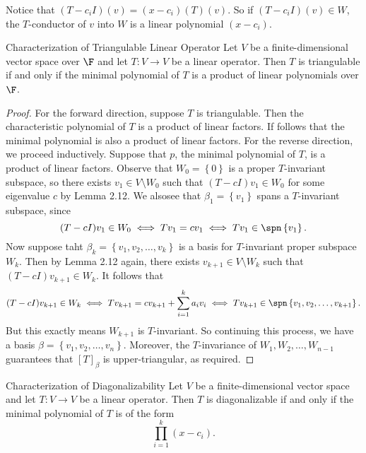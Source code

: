 \documentclass[linearalgebraII]{subfiles}
\begin{document}
    \begin{remark}
        Notice that $(T-c_iI)(v) = (x-c_i)(T)(v)$. So if $(T-c_iI)(v)\in W$, the $T$-conductor of $v$ into $W$ is a linear polynomial $(x-c_i)$.
    \end{remark}

    \begin{theorem}{Characterization of Triangulable Linear Operator}
        Let $V$ be a finite-dimensional vector space over $\F$ and let $T:V\to V$ be a linear operator. Then $T$ is triangulable if and only if the minimal polynomial of $T$ is a product of linear polynomials over $\F$.
    \end{theorem}

    \begin{proof}
        For the forward direction, suppose $T$ is triangulable. Then the characteristic polynomial of $T$ is a product of linear factors. If follows that the minimal polynomial is also a product of linear factors. For the reverse direction, we proceed inductively. Suppose that $p$, the minimal polynomial of $T$, is a product of linear factors. Observe that $W_0 = \left\lbrace 0 \right\rbrace$ is a proper $T$-invariant subspace, so there exists $v_1\in V\setminus W_0$ such that $(T-cI)v_1\in
        W_0$ for some eigenvalue $c$ by Lemma 2.12. We alsosee that $\beta_1 = \left\lbrace v_1 \right\rbrace$ spans a $T$-invariant subspace, since
        \begin{equation*}
            (T-cI)v_1\in W_0 \iff Tv_1 = cv_1 \iff Tv_1\in \spn \left\lbrace v_1 \right\rbrace.
        \end{equation*}
        Now suppose taht $\beta_k = \left\lbrace v_1, v_2, \ldots, v_k \right\rbrace$ is a basis for $T$-invariant proper subspace $W_k$. Then by Lemma 2.12 again, there exists $v_{k+1}\in V\setminus W_k$ such that $(T-cI)v_{k+1}\in W_k$. It follows that
        \begin{equation*}
            (T-cI)v_{k+1}\in W_k \iff Tv_{k+1} = cv_{k+1} + \sum^{k}_{i=1} a_iv_i  \iff Tv_{k+1}\in \spn \left\lbrace v_1, v_2, \ldots, v_{k+1} \right\rbrace.
        \end{equation*}
        But this exactly means $W_{k+1}$ is $T$-invariant. So continuing this process, we have a basis $\beta = \left\lbrace v_1, v_2, \ldots, v_n \right\rbrace$. Moreover, the $T$-invariance of $W_1, W_2, \ldots, W_{n-1}$ guarantees that $[T]_\beta$ is upper-triangular, as required.
    \end{proof}

    \begin{theorem}{Characterization of Diagonalizability}
        Let $V$ be a finite-dimensional vector space and let $T:V\to V$ be a linear operator. Then $T$ is diagonalizable if and only if the minimal polynomial of $T$ is of the form
        \begin{equation*}
            \prod^{k}_{i=1} (x-c_i).
        \end{equation*}
    \end{theorem}
\end{document}
